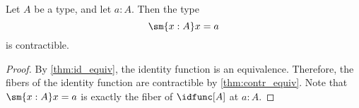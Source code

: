 \begin{cor}\label{cor:contr_path}
Let $A$ be a type, and let $a:A$. Then the type
\begin{equation*}
\sm{x:A}x=a
\end{equation*}
is contractible.
\end{cor}

\begin{proof}
By \autoref{thm:id_equiv}, the identity function is an equivalence. Therefore, the fibers of the identity function are contractible by \autoref{thm:contr_equiv}. Note that $\sm{x:A}x=a$ is exactly the fiber of $\idfunc[A]$ at $a:A$.
\end{proof}

\begin{comment}
\begin{proof}
We have the term $(a,\refl{a}):\sm{x:A}a=x$, which we take for the center of contraction. To construct the contraction, we have to show that
\begin{equation*}
\prd{p:\sm{x:A}a=x} (a,\refl{a})=p.
\end{equation*}
By the induction principle for dependent pair types it suffices to construct a term of type
\begin{equation*}
\prd{x:A}{p:a=x} (a,\refl{a})=(x,p)
\end{equation*}
Note that we may proceed here by path induction on $p$. That is, it suffices to consider the case $p\jdeq\refl{a}$, and show that $(a,\refl{a})=(a,\refl{a})$. Here we choose $\refl{(a,\refl{a})}$.
\end{proof}
\end{comment}

